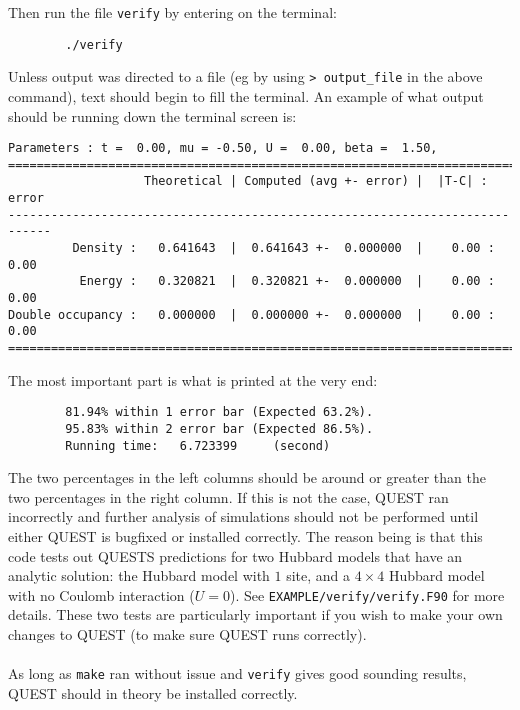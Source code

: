 \documentclass[12pt]{article}
\begin{document}
        Then run the file \texttt{verify} by entering on the terminal:
        \begin{verbatim}
        ./verify
        \end{verbatim}
        Unless output was directed to a file (eg by using \texttt{> output\_file} in the above command), text should begin to fill the terminal.
        An example of what output should be running down the terminal screen is:
        \begin{verbatim}
Parameters : t =  0.00, mu = -0.50, U =  0.00, beta =  1.50, 
============================================================================
                   Theoretical | Computed (avg +- error) |  |T-C| : error
----------------------------------------------------------------------------
         Density :   0.641643  |  0.641643 +-  0.000000  |    0.00 :  0.00
          Energy :   0.320821  |  0.320821 +-  0.000000  |    0.00 :  0.00
Double occupancy :   0.000000  |  0.000000 +-  0.000000  |    0.00 :  0.00
============================================================================
        \end{verbatim}
        The most important part is what is printed at the very end:
        \begin{verbatim}
        81.94% within 1 error bar (Expected 63.2%).
        95.83% within 2 error bar (Expected 86.5%).
        Running time:   6.723399     (second)
        \end{verbatim}
        The two percentages in the left columns should be around or greater than the two percentages in the right column.
        If this is not the case, QUEST ran incorrectly and further analysis of simulations should not be performed until either QUEST is bugfixed or installed correctly.
        The reason being is that this code tests out QUESTS predictions for two Hubbard models that have an analytic solution: the Hubbard model with $1$ site, and a $4\times 4$ Hubbard model with no Coulomb interaction ($U=0$).
        See \texttt{EXAMPLE/verify/verify.F90} for more details.
        These two tests are particularly important if you wish to make your own changes to QUEST (to make sure QUEST runs correctly). \\
        \\
        As long as \texttt{make} ran without issue and \texttt{verify} gives good sounding results, QUEST should in theory be installed correctly.
\end{document}
